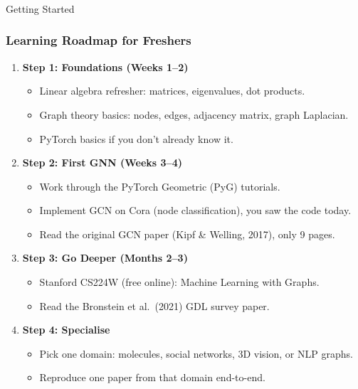 \begin{frame}[fragile]\frametitle{}
\begin{center}
{\Large Getting Started}
\end{center}
\end{frame}

\begin{frame}[fragile]\frametitle{Learning Roadmap for Freshers}

\begin{enumerate}
  \item \textbf{Step 1: Foundations (Weeks 1--2)}
    \begin{itemize}
      \item Linear algebra refresher: matrices, eigenvalues, dot products.
      \item Graph theory basics: nodes, edges, adjacency matrix, graph Laplacian.
      \item PyTorch basics if you don't already know it.
    \end{itemize}
  \item \textbf{Step 2: First GNN (Weeks 3--4)}
    \begin{itemize}
      \item Work through the PyTorch Geometric (PyG) tutorials.
      \item Implement GCN on Cora (node classification), you saw the code today.
      \item Read the original GCN paper (Kipf \& Welling, 2017), only 9 pages.
    \end{itemize}
  \item \textbf{Step 3: Go Deeper (Months 2--3)}
    \begin{itemize}
      \item Stanford CS224W (free online): Machine Learning with Graphs.
      \item Read the Bronstein et al.\ (2021) GDL survey paper.
    \end{itemize}
  \item \textbf{Step 4: Specialise}
    \begin{itemize}
      \item Pick one domain: molecules, social networks, 3D vision, or NLP graphs.
      \item Reproduce one paper from that domain end-to-end.
    \end{itemize}
\end{enumerate}

\end{frame}


